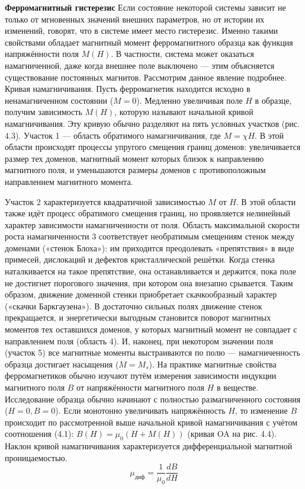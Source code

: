 \documentclass[12pt,a4paper]{article}
\begin{document}
\textbf{Ферромагнитный гистерезис}
Если состояние некоторой системы зависит не только от мгновенных
значений внешних параметров, но от истории их изменений, говорят, что
в системе имеет место гистерезис.
Именно такими свойствами обладает магнитный момент ферромагнитного образца как функция напряжённости поля $M(H)$. В частности,
система может оказаться намагниченной, даже когда внешнее поле выключено — этим объясняется существование постоянных магнитов. Рассмотрим данное явление подробнее.
Кривая намагничивания. Пусть ферромагнетик находится исходно
в ненамагниченном состоянии ($M = 0$). Медленно увеличивая поле $H$ в
образце, получим зависимость $M(H)$, которую называют начальной кривой намагничивания. Эту кривую обычно разделяют на пять условных
участков (рис. 4.3).
Участок 1 — область обратимого намагничивания, где $M = \chi H$.
В этой области происходят процессы упругого смещения границ доменов: увеличивается размер тех доменов, магнитный момент которых близок к направлению магнитного поля, и уменьшаются размеры доменов
с противоположным направлением магнитного момента.

Участок 2 характеризуется
квадратичной зависимостью $M$
от $H$. В этой области также идёт
процесс обратимого смещения
границ, но проявляется нелинейный характер зависимости
намагниченности от поля.
Область максимальной скорости роста намагниченности 3 соответствует необратимым смещениям стенок между доменами («стенок Блоха»): им приходится преодолевать «препятствия» в виде
примесей, дислокаций и дефектов кристаллической решётки. Когда стенка наталкивается на такое препятствие, она останавливается и держится, пока поле не достигнет порогового значения, при котором она внезапно срывается. Таким образом, движение доменной стенки приобретает
скачкообразный характер («скачки Баркгаузена»).
В достаточно сильных полях движение стенок прекращается, и энергетически выгодным становится поворот магнитных моментов тех оставшихся доменов, у которых магнитный момент не совпадает с направлением поля (область 4).
И, наконец, при некотором значении поля (участок 5) все магнитные
моменты выстраиваются по полю — намагниченность образца достигает
насыщения ($M = M_s$).
На практике магнитные свойства ферромагнетиков обычно изучают
путём измерения зависимости индукции магнитного поля $B$ от напряжённости магнитного поля $H$ в веществе. Исследование образца обычно
начинают с полностью размагниченного состояния ($H = 0, B = 0$). Если
монотонно увеличивать напряжённость $H$, то изменение $B$ происходит
по рассмотренной выше начальной кривой намагничивания с учётом соотношения (4.1): $B(H) = \mu_0(H + M(H))$ (кривая OA на рис. 4.4).
Наклон кривой намагничивания характеризуется дифференциальной магнитной проницаемостью.
\[
\mu_\text{диф} = \frac{1}{\mu_0} \frac{dB}{dH}
\] 
\end{document}
